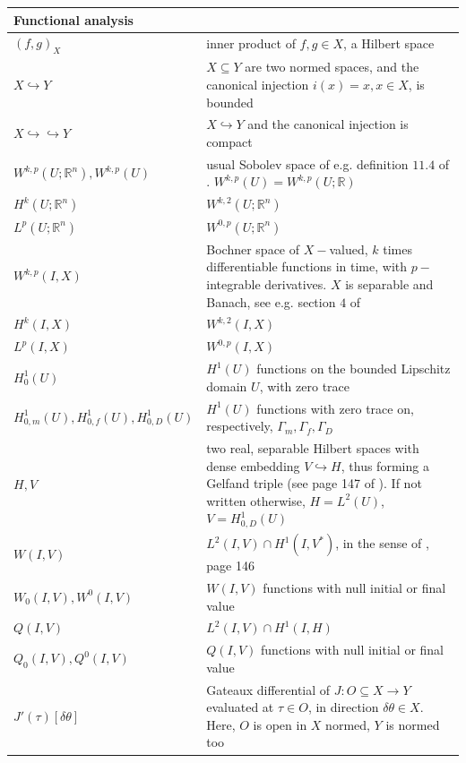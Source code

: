 \documentclass[english,a4paper,10pt,oneside]{scrbook}	%
\theoremstyle{break}
\theoremstyle{remark}
\newcommand{\mR}{\mathbb{R}}
\newcommand{\emb}{\hookrightarrow}
\newcommand{\te}{\theta}
\begin{document}
\begin{longtable}{ll}
\multicolumn{2}{l}{\textbf{Functional analysis}}    \\ 
\hline
$(f,g)_X$ & inner product of $f,g\in X$, a Hilbert space                       \\ 
\hline
$X\emb Y$ & \makecell[l]{$X \subseteq Y$ are two normed spaces, and the canonical injection\\$i(x)=x, x \in X$, is bounded}             \\ 
\hline
$X\emb \emb Y$ & $X\emb Y$ and the canonical injection is compact                       \\ 
\hline
$W^{k,p}(U;\mR^n), W^{k,p}(U)$ & \makecell[l]{usual Sobolev space of e.g. definition $11.4$ of \cite{leoni}.\\ $W^{k,p}(U)=W^{k,p}(U;\mR)$}                     \\ 
\hline
$H^{k}(U;\mR^n)$ & $W^{k,2}(U;\mR^n)$                    \\ 
\hline
$L^{p}(U;\mR^n)$ & $W^{0,p}(U;\mR^n)$                    \\ 
\hline
$W^{k,p}(I,X)$ & \makecell[l]{Bochner space of $X-$valued, $k$ times differentiable functions in time,\\with $p-$integrable derivatives. $X$ is separable and Banach,\\ see e.g. section $4$ of \cite{kreuter}}                  \\ 
\hline
$H^k(I,X)$ & $W^{k,2}(I,X)$ \\ 
\hline
$L^p(I,X)$ & $W^{0,p}(I,X)$ \\ 
\hline
$H^1_0(U)$ & $H^1(U)$ functions on the bounded Lipschitz domain $U$, with zero trace \\ 
\hline
$H^1_{0,m}(U), H^1_{0,f}(U), H^1_{0,D}(U)$ & $H^1(U)$ functions with zero trace on, respectively, $\Gamma_m, \Gamma_f, \Gamma_D$\\ 
\hline
$H,V$ & \makecell[l]{two real, separable Hilbert spaces with dense embedding $V\emb H$,\\ thus forming a Gelfand triple (see page 147 of \cite{trol}).\\ If not written otherwise, $H=L^2(U)$, $V = H^1_{0,D}(U)$} \\ 
\hline
$W(I,V)$ & $L^2(I,V)\cap H^1(I,V^*)$, in the sense of \cite{trol}, page 146 	\\ 
\hline
$W_0(I,V), W^0(I,V)$ & $W(I,V)$ functions with null initial or final value 	\\ 
\hline
$Q(I,V)$ & $L^2(I,V)\cap H^1(I,H)$ 	\\ 
\hline
$Q_0(I,V), Q^0(I,V)$ & $Q(I,V)$ functions with null initial or final value	\\ 
\hline
$J'(\tau)[\delta \te]$ & \makecell[l]{Gateaux differential of $J: O\subseteq X \rightarrow Y$ evaluated at $\tau \in O$,\\in direction $\delta \te \in X$. Here, $O$ is open in $X$ normed, $Y$ is normed too} \\ 
\hline


\end{longtable}
\end{document}
